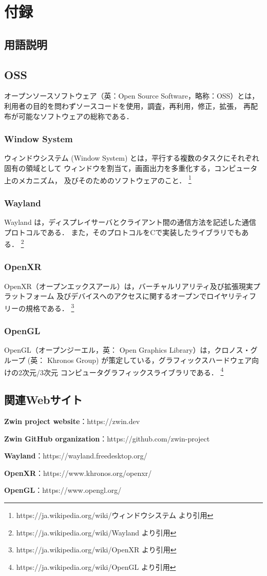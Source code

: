 \section{付録}

\subsection{用語説明}

\subsection*{OSS}
オープンソースソフトウェア（英：Open Source Software，略称：OSS）とは，
利用者の目的を問わずソースコードを使用，調査，再利用，修正，拡張，
再配布が可能なソフトウェアの総称である．

\subsubsection*{Window System}
ウィンドウシステム (Window System) とは，平行する複数のタスクにそれぞれ固有の領域として
ウィンドウを割当て，画面出力を多重化する，コンピュータ上のメカニズム，
及びそのためのソフトウェアのこと．
\footnote{https://ja.wikipedia.org/wiki/ウィンドウシステム より引用}

\subsubsection*{Wayland}
Wayland は，ディスプレイサーバとクライアント間の通信方法を記述した通信プロトコルである．
また，そのプロトコルをCで実装したライブラリでもある．
\footnote{https://ja.wikipedia.org/wiki/Wayland より引用}

\subsubsection{OpenXR}
OpenXR（オープンエックスアール）は，バーチャルリアリティ及び拡張現実プラットフォーム
及びデバイスへのアクセスに関するオープンでロイヤリティフリーの規格である．
\footnote{https://ja.wikipedia.org/wiki/OpenXR より引用}

\subsubsection*{OpenGL}
OpenGL（オープンジーエル，英： Open Graphics Library）は，クロノス・グループ
(英： Khronos Group) が策定している，グラフィックスハードウェア向けの2次元/3次元
コンピュータグラフィックスライブラリである．
\footnote{https://ja.wikipedia.org/wiki/OpenGL より引用}

\subsection{関連Webサイト}

\textbf{Zwin project website}：https://zwin.dev

\textbf{Zwin GitHub organization}：https://github.com/zwin-project

\textbf{Wayland}：https://wayland.freedesktop.org/

\textbf{OpenXR}：https://www.khronos.org/openxr/

\textbf{OpenGL}：https://www.opengl.org/
